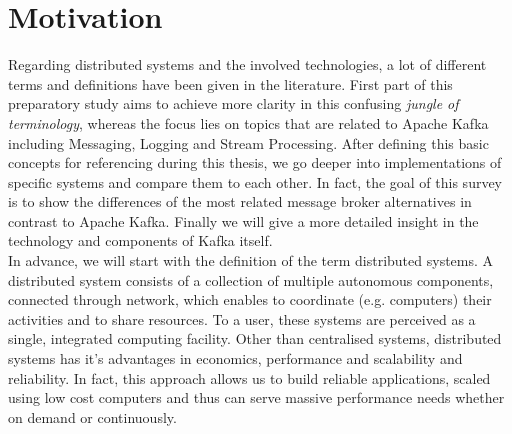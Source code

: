 \chapter{Motivation}
Regarding distributed systems and the involved technologies, a lot of different
terms and definitions have been given in the literature. First part of this
preparatory study aims to achieve more clarity in this confusing \textit{jungle of
terminology}, whereas the focus lies on topics that are related to Apache
Kafka including Messaging, Logging and Stream Processing. After defining this
basic concepts for referencing during this thesis, we go deeper into
implementations of specific systems and compare them to each other. In fact, the
goal of this survey is to show the differences of the most related message
broker alternatives in contrast to Apache Kafka. Finally we will give a more
detailed insight in the technology and components of Kafka itself.\\

In advance, we will start with the definition of the term distributed systems. A
distributed system consists of a collection of multiple autonomous components,
connected through network, which enables to coordinate  (e.g. computers) their
activities and to share resources. To a user, these systems are perceived as a
single, integrated computing facility. Other than centralised systems,
distributed systems has it's advantages in economics, performance and
scalability and reliability. In fact, this approach allows us to build reliable
applications, scaled using low cost computers and thus can serve massive
performance needs whether on demand or continuously.\cite{POSA1}\cite{TAN06}
